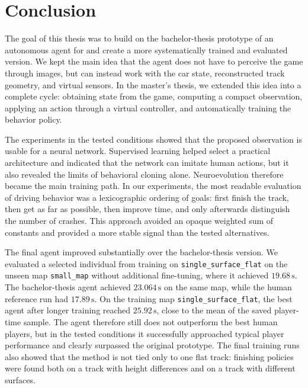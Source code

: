 \chapter*{Conclusion}

The goal of this thesis was to build on the bachelor-thesis prototype of an autonomous agent for \Trackmania{} and create a more systematically trained and evaluated version. We kept the main idea that the agent does not have to perceive the game through images, but can instead work with the car state, reconstructed track geometry, and virtual sensors. In the master's thesis, we extended this idea into a complete cycle: obtaining state from the game, computing a compact observation, applying an action through a virtual controller, and automatically training the behavior policy.

The experiments in the tested conditions showed that the proposed observation is usable for a neural network. Supervised learning helped select a practical architecture and indicated that the network can imitate human actions, but it also revealed the limits of behavioral cloning alone. Neuroevolution therefore became the main training path. In our experiments, the most readable evaluation of driving behavior was a lexicographic ordering of goals: first finish the track, then get as far as possible, then improve time, and only afterwards distinguish the number of crashes. This approach avoided an opaque weighted sum of constants and provided a more stable signal than the tested alternatives.

The final agent improved substantially over the bachelor-thesis version. We evaluated a selected individual from training on \texttt{single\_surface\_flat} on the unseen map \texttt{small\_map} without additional fine-tuning, where it achieved \(19.68\,\mathrm{s}\). The bachelor-thesis agent achieved \(23.064\,\mathrm{s}\) on the same map, while the human reference run had \(17.89\,\mathrm{s}\). On the training map \texttt{single\_surface\_flat}, the best agent after longer training reached \(25.92\,\mathrm{s}\), close to the mean of the saved player-time sample. The agent therefore still does not outperform the best human players, but in the tested conditions it successfully approached typical player performance and clearly surpassed the original prototype. The final training runs also showed that the method is not tied only to one flat track: finishing policies were found both on a track with height differences and on a track with different surfaces.

